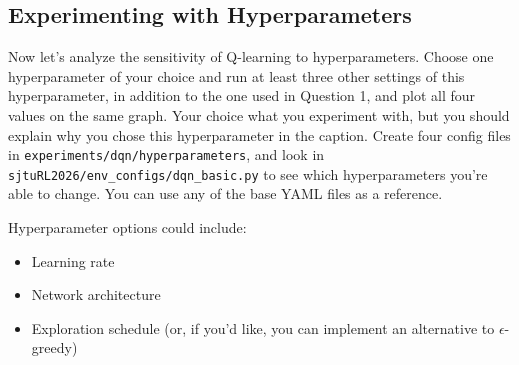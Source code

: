 \dqnAnswerDoubleQ

\subsection{Experimenting with Hyperparameters} Now let's analyze the sensitivity of Q-learning to hyperparameters. Choose one hyperparameter of your choice and run at least three other settings of this hyperparameter, in addition to the one used in Question 1, and plot all four values on the same graph. Your choice what you experiment with, but you should explain why you chose this hyperparameter in the caption. Create four config files in \verb|experiments/dqn/hyperparameters|, and look in \verb|sjtuRL2026/env_configs/dqn_basic.py| to see which hyperparameters you're able to change. You can use any of the base YAML files as a reference.

Hyperparameter options could include:
\begin{itemize}
    \item Learning rate
    \item Network architecture
    \item Exploration schedule (or, if you'd like, you can implement an alternative to $\epsilon$-greedy)
\end{itemize}

\dqnAnswerHyperparams
